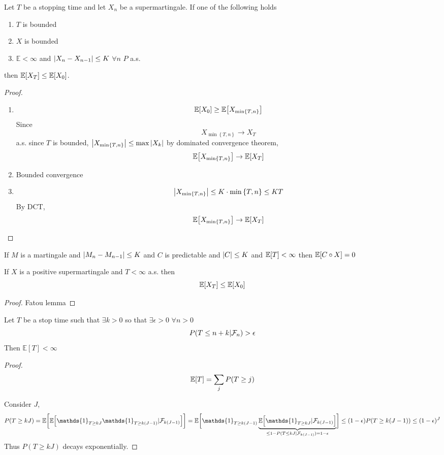 \begin{theorem}
	Let $T$ be a stopping time and let $X_n$ be a supermartingale. If one of the following holds
	\begin{enumerate}
		\item $T$ is bounded
		\item $X$ is bounded
		\item $\mathbb{E} < \infty $ and $\abs{X_n - X_{n-1}} \leq K$ $\forall n$ $P$ a.s. 
	\end{enumerate}
then $\mathbb{E} [X_T] \leq \mathbb{E}\qty[X_0]$.
\begin{proof}
	\begin{enumerate}
		\item $$\mathbb{E} \qty[X_0] \geq \mathbb{E} \qty[X_{\min\left\{ T,n \right\}}]$$
		Since
		$$X_{\min\left\{ T,n \right\}} \to X_T$$
		a.s. since $T$ is bounded, $\abs{X_{\min\left\{ T,n \right\}} } \leq \max \abs{X_k}$ by dominated convergence theorem, 
		$$\mathbb{E} \qty[X_{\min\left\{ T,n \right\}}] \to \mathbb{E}\qty[X_T]$$
		
		
		\item  Bounded convergence
		
		
		\item $$\abs{X_{\min\left\{ T,n \right\}}} \leq K\cdot\min\left\{ T,n \right\} \leq KT$$
			By DCT, 
			$$\mathbb{E} \qty[X_{\min\left\{ T,n \right\}}] \to \mathbb{E}\qty[X_T]$$
		
	\end{enumerate}
\end{proof}

\begin{coll}
	If $M$ is a martingale and $\abs{M_n-M_{n-1}} \leq K$ and $C$ is predictable and $\abs{C}\leq K$ and $\mathbb{E} \qty[T] <\infty$ then $\mathbb{E} \qty[C \circ X] = 0$
\end{coll}

\begin{coll}
	If $X$ is a positive supermartingale and $T<\infty$ a.s. then
	$$\mathbb{E}[X_T] \leq \mathbb{E} \qty[X_0]$$
	\begin{proof}
		Fatou lemma
	\end{proof}
\end{coll}
\end{theorem}

\begin{lemma}
	Let $T$ be a stop time such that $\exists k > 0$ so that $\exists \epsilon>0$ $\forall n>0$
	$$P\qty(T \leq n+k | \mathcal{F}_n) > \epsilon$$
	Then $\mathbb{E} [T]<\infty$
	\begin{proof}
		$$\mathbb{E} \qty[T] = \sum_j P(T\geq j)$$
		
		Consider $J$, 
		$$P(T\geq kJ) = \mathbb{E} \qty\bigg[\mathbb{E} \qty[\mathds{1}_{T\geq kJ}\mathds{1}_{T\geq k(J-1)}|\mathcal{F}_{k(J-1)}]] = \mathbb{E} \qty\bigg[\mathds{1}_{T\geq k(J-1)} \underbrace{\mathbb{E} \qty[\mathds{1}_{T\geq kJ}|\mathcal{F}_{k(J-1)}]}_{\leq 1-P(T\leq kJ|\mathcal{F}_{k(J-1)}) = 1-\epsilon}] \leq (1-\epsilon) P(T\geq k(J-1)) \leq (1-\epsilon)^J$$
		Thus $P(T\geq kJ)$ decays exponentially.
\end{proof}
\end{lemma}